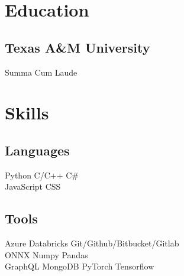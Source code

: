 \documentclass[10pt]{resume-openfont}
\begin{document}
\begin{minipage}[t]{1\textwidth} 
\end{minipage}

\vspace{1mm} %

\begin{minipage}[t]{1\textwidth} 
\begin{multicols}{2}
    \section{\Large Education} 
    \subsection{Texas A\&M University}
    Summa Cum Laude \\
    \sectionsep
    
    \columnbreak
    
    \section{\Large Skills}
    \subsection{Languages}
    Python \textbullet{} C/C++ \textbullet{} C\# \\
    JavaScript \textbullet{} CSS
    \subsection{Tools}
    Azure \textbullet{} Databricks \textbullet{} Git/Github/Bitbucket/Gitlab \\ 
    ONNX \textbullet{} Numpy \textbullet{} Pandas \\
    GraphQL \textbullet{} MongoDB
    PyTorch \textbullet{} Tensorflow
    \sectionsep

\end{multicols}
\end{minipage} 

\vspace{-3mm} %
\end{document}

